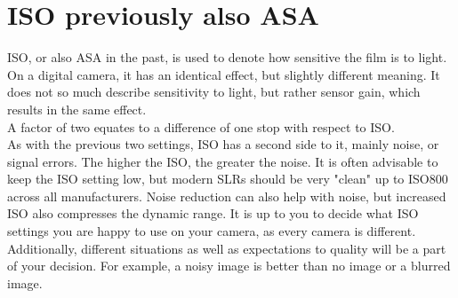 \section{ISO previously also ASA}
\label{sec:ISO}

\Gls{ISO}, or also ASA in the past, is used to denote how sensitive the film is to light. On a digital camera, it has an identical effect, but slightly different meaning. It does not so much describe sensitivity to light, but rather \gls{sensor} gain, which results in the same effect.
\\
A factor of two equates to a difference of one \gls{stop} with respect to \gls{ISO}.
\\[\baselineskip]
As with the previous two settings, \gls{ISO} has a second side to it, mainly noise, or signal errors. The higher the \gls{ISO}, the greater the noise. It is often advisable to keep the \gls{ISO} setting low, but modern \glspl{SLR} should be very "clean" up to ISO800 across all manufacturers. Noise reduction can also help with noise, but increased \gls{ISO} also compresses the dynamic range. It is up to you to decide what \gls{ISO} settings you are happy to use on your camera, as every camera is different. Additionally, different situations as well as expectations to quality will be a part of your decision. For example, a noisy image is better than no image or a blurred image.


